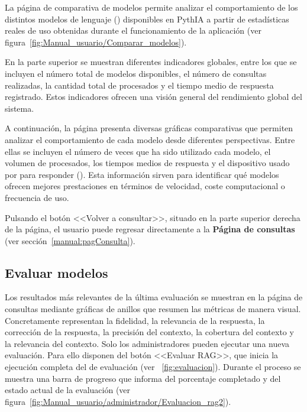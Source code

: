 La página de comparativa de modelos permite analizar el comportamiento de los distintos modelos de lenguaje () disponibles en PythIA a partir de estadísticas reales de uso obtenidas durante el funcionamiento de la aplicación (ver figura~\ref{fig:Manual_usuario/Comparar_modelos}).


En la parte superior se muestran diferentes indicadores globales, entre los que se incluyen el número total de modelos disponibles, el número de consultas realizadas, la cantidad total de  procesados y el tiempo medio de respuesta registrado. Estos indicadores ofrecen una visión general del rendimiento global del sistema.

A continuación, la página presenta diversas gráficas comparativas que permiten analizar el comportamiento de cada modelo desde diferentes perspectivas. Entre ellas se incluyen el número de veces que ha sido utilizado cada modelo, el volumen de  procesados, los tiempos medios de respuesta y el dispositivo usado por  para responder (). Esta información sirven para identificar qué modelos ofrecen mejores prestaciones en términos de velocidad, coste computacional o frecuencia de uso.

Pulsando el botón <<Volver a consultar>>, situado en la parte superior derecha de la página, el usuario puede regresar directamente a la \textbf{Página de consultas} (ver sección~\ref{manual:pagConsulta}).


\subsection{Evaluar modelos}
\label{manual:evaluar}

Los resultados más relevantes de la última evaluación se muestran en la página de consultas mediante gráficas de anillos que resumen las métricas de manera visual. Concretamente representan la fidelidad, la relevancia de la respuesta, la corrección de la respuesta, la precisión del contexto, la cobertura del contexto y la relevancia del contexto. Solo los administradores pueden ejecutar una nueva evaluación. Para ello disponen del botón <<Evaluar RAG>>, que inicia la ejecución completa del  de evaluación (ver ~\ref{fig:evaluacion}). Durante el proceso se muestra una barra de progreso que informa del porcentaje completado y del estado actual de la evaluación (ver figura~\ref{fig:Manual_usuario/administrador/Evaluacion_rag2}).


